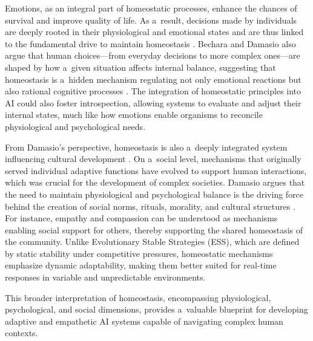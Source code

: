 Emotions, as an integral part of homeostatic processes, enhance the chances of survival and improve quality of life. As a~result, decisions made by individuals are deeply rooted in their physiological and emotional states and are thus linked to the fundamental drive to maintain homeostasis 
\parencite[][]{burdakov_reactive_2019}. %
 Bechara and Damasio also argue that human choices---from everyday decisions to more complex ones---are shaped by how a~given situation affects internal balance, suggesting that homeostasis is a~hidden mechanism regulating not only emotional reactions but also rational cognitive processes 
\parencite[][]{bechara_emotion_2000}. %
 The integration of homeostatic principles into AI could also foster introspection, allowing systems to evaluate and adjust their internal states, much like how emotions enable organisms to reconcile physiological and psychological needs.



From Damasio's perspective, homeostasis is also a~deeply integrated system influencing cultural development 
\parencites[][]{klos_neuron_2014}[][]{damasio_strange_2018}. %
 On a~social level, mechanisms that originally served individual adaptive functions have evolved to support human interactions, which was crucial for the development of complex societies. Damasio argues that the need to maintain physiological and psychological balance is the driving force behind the creation of social norms, rituals, morality, and cultural structures 
\parencite[][]{damasio_strange_2018}. %
 For instance, empathy and compassion can be understood as mechanisms enabling social support for others, thereby supporting the shared homeostasis of the community. Unlike Evolutionary Stable Strategies (ESS), which are defined by static stability under competitive pressures, homeostatic mechanisms emphasize dynamic adaptability, making them better suited for real-time responses in variable and unpredictable environments.



This broader interpretation of homeostasis, encompassing physiological, psychological, and social dimensions, provides a~valuable blueprint for developing adaptive and empathetic AI systems capable of navigating complex human contexts.



